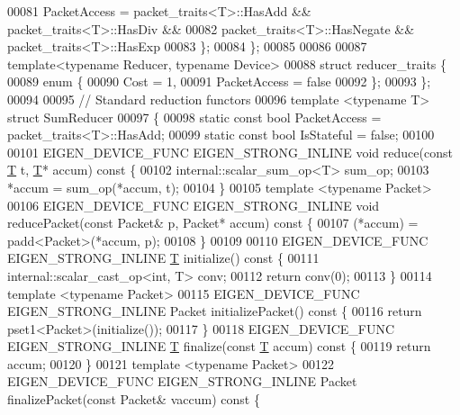 \begin{DoxyCode}
00081     PacketAccess = packet\_traits<T>::HasAdd && packet\_traits<T>::HasDiv &&
00082                    packet\_traits<T>::HasNegate && packet\_traits<T>::HasExp
00083   \};
00084 \};
00085 
00086 
00087 \textcolor{keyword}{template}<\textcolor{keyword}{typename} Reducer, \textcolor{keyword}{typename} Device>
00088 \textcolor{keyword}{struct }reducer\_traits \{
00089   \textcolor{keyword}{enum} \{
00090     Cost = 1,
00091     PacketAccess = \textcolor{keyword}{false}
00092   \};
00093 \};
00094 
00095 \textcolor{comment}{// Standard reduction functors}
00096 \textcolor{keyword}{template} <\textcolor{keyword}{typename} T> \textcolor{keyword}{struct }SumReducer
00097 \{
00098   \textcolor{keyword}{static} \textcolor{keyword}{const} \textcolor{keywordtype}{bool} PacketAccess = packet\_traits<T>::HasAdd;
00099   \textcolor{keyword}{static} \textcolor{keyword}{const} \textcolor{keywordtype}{bool} IsStateful = \textcolor{keyword}{false};
00100 
00101   EIGEN\_DEVICE\_FUNC EIGEN\_STRONG\_INLINE \textcolor{keywordtype}{void} reduce(\textcolor{keyword}{const} \hyperlink{group___sparse_core___module_class_eigen_1_1_triplet}{T} t, \hyperlink{group___sparse_core___module_class_eigen_1_1_triplet}{T}* accum)\textcolor{keyword}{ const }\{
00102     internal::scalar\_sum\_op<T> sum\_op;
00103     *accum = sum\_op(*accum, t);
00104   \}
00105   \textcolor{keyword}{template} <\textcolor{keyword}{typename} Packet>
00106   EIGEN\_DEVICE\_FUNC EIGEN\_STRONG\_INLINE \textcolor{keywordtype}{void} reducePacket(\textcolor{keyword}{const} Packet& p, Packet* accum)\textcolor{keyword}{ const }\{
00107     (*accum) = padd<Packet>(*accum, p);
00108   \}
00109 
00110   EIGEN\_DEVICE\_FUNC EIGEN\_STRONG\_INLINE \hyperlink{group___sparse_core___module_class_eigen_1_1_triplet}{T} initialize()\textcolor{keyword}{ const }\{
00111     internal::scalar\_cast\_op<int, T> conv;
00112     \textcolor{keywordflow}{return} conv(0);
00113   \}
00114   \textcolor{keyword}{template} <\textcolor{keyword}{typename} Packet>
00115   EIGEN\_DEVICE\_FUNC EIGEN\_STRONG\_INLINE Packet initializePacket()\textcolor{keyword}{ const }\{
00116     \textcolor{keywordflow}{return} pset1<Packet>(initialize());
00117   \}
00118   EIGEN\_DEVICE\_FUNC EIGEN\_STRONG\_INLINE \hyperlink{group___sparse_core___module_class_eigen_1_1_triplet}{T} finalize(\textcolor{keyword}{const} \hyperlink{group___sparse_core___module_class_eigen_1_1_triplet}{T} accum)\textcolor{keyword}{ const }\{
00119     \textcolor{keywordflow}{return} accum;
00120   \}
00121   \textcolor{keyword}{template} <\textcolor{keyword}{typename} Packet>
00122   EIGEN\_DEVICE\_FUNC EIGEN\_STRONG\_INLINE Packet finalizePacket(\textcolor{keyword}{const} Packet& vaccum)\textcolor{keyword}{ const }\{

\end{DoxyCode}
